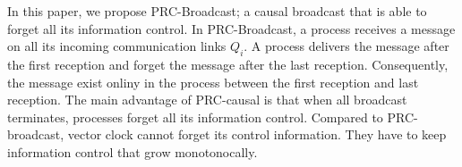 




In this paper, we propose PRC-Broadcast; a causal broadcast that is
able to forget all its information control. In PRC-Broadcast, a
process receives a message on all its incoming communication links
$Q_i$. A process delivers the message after the first reception and
forget the message after the last reception. Consequently, the message
exist onliny in the process between the first reception and last
reception. The main advantage of PRC-causal is that when all broadcast
terminates, processes forget all its information control. Compared to
 PRC-broadcast, vector clock cannot forget its control
 information. They have to keep information control that grow monotonocally.


